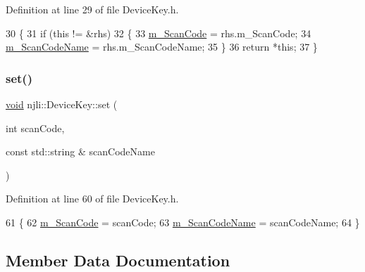 Definition at line 29 of file Device\+Key.\+h.


\begin{DoxyCode}
30     \{
31       \textcolor{keywordflow}{if} (\textcolor{keyword}{this} != &rhs)
32         \{
33           \mbox{\hyperlink{classnjli_1_1_device_key_a326eb4f8f1b7abc2b916c8ed11d8dca6}{m\_ScanCode}} = rhs.m\_ScanCode;
34           \mbox{\hyperlink{classnjli_1_1_device_key_ac619bfe3e166c9f9ddda4e308f4315d9}{m\_ScanCodeName}} = rhs.m\_ScanCodeName;
35         \}
36       \textcolor{keywordflow}{return} *\textcolor{keyword}{this};
37     \}
\end{DoxyCode}
\mbox{\label{classnjli_1_1_device_key_a9bf8e7ef5d2038aefc61d8732ee1169a}} 
\subsubsection{\texorpdfstring{set()}{set()}}
{\footnotesize\ttfamily \mbox{\hyperlink{_thread_8h_af1e856da2e658414cb2456cb6f7ebc66}{void}} njli\+::\+Device\+Key\+::set (\begin{DoxyParamCaption}\item[{int}]{scan\+Code,  }\item[{const std\+::string \&}]{scan\+Code\+Name }\end{DoxyParamCaption})\hspace{0.3cm}{\ttfamily [inline]}}



Definition at line 60 of file Device\+Key.\+h.


\begin{DoxyCode}
61     \{
62       \mbox{\hyperlink{classnjli_1_1_device_key_a326eb4f8f1b7abc2b916c8ed11d8dca6}{m\_ScanCode}} = scanCode;
63       \mbox{\hyperlink{classnjli_1_1_device_key_ac619bfe3e166c9f9ddda4e308f4315d9}{m\_ScanCodeName}} = scanCodeName;
64     \}
\end{DoxyCode}


\subsection{Member Data Documentation}
\mbox{\label{classnjli_1_1_device_key_a326eb4f8f1b7abc2b916c8ed11d8dca6}} 
